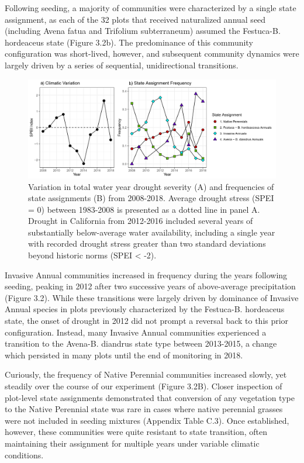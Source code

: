 \documentclass[twoside,12pt,final]{ucthesis-CA2012}
\begin{document}
\begin{ucmainmatter}
Following seeding, a majority of communities were characterized by a single state assignment, as each of the 32 plots that received naturalized annual seed (including Avena fatua and Trifolium subterraneum) assumed the Festuca-B. hordeaceus state (Figure 3.2b).
The predominance of this community configuration was short-lived, however, and subsequent community dynamics were largely driven by a series of sequential, unidirectional transitions.
\begin{figure}
\centering
\includegraphics[width=\textwidth,height=0.3\textheight]{figure/Fig3_1.png}
\caption{Variation in total water year drought severity (A) and frequencies of state assignments (B) from 2008-2018. Average drought stress (SPEI = 0) between 1983-2008 is presented as a dotted line in panel A. Drought in California from 2012-2016 included several years of substantially below-average water availability, including a single year with recorded drought stress greater than two standard deviations beyond historic norms (SPEI \textless{} -2). \label{fig-3-2}}
\end{figure}
Invasive Annual communities increased in frequency during the years following seeding, peaking in 2012 after two successive years of above-average precipitation (Figure 3.2).
While these transitions were largely driven by dominance of Invasive Annual species in plots previously characterized by the Festuca-B. hordeaceus state, the onset of drought in 2012 did not prompt a reversal back to this prior configuration.
Instead, many Invasive Annual communities experienced a transition to the Avena-B. diandrus state type between 2013-2015, a change which persisted in many plots until the end of monitoring in 2018.

Curiously, the frequency of Native Perennial communities increased slowly, yet steadily over the course of our experiment (Figure 3.2B).
Closer inspection of plot-level state assignments demonstrated that conversion of any vegetation type to the Native Perennial state was rare in cases where native perennial grasses were not included in seeding mixtures (Appendix Table C.3).
Once established, however, these communities were quite resistant to state transition, often maintaining their assignment for multiple years under variable climatic conditions.


\end{ucmainmatter}
\end{document}
